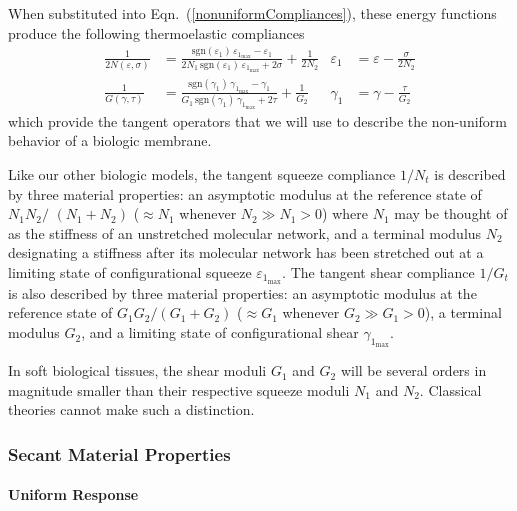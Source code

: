 When substituted into Eqn.~(\ref{nonuniformCompliances}), these energy functions produce the following thermo\-elastic compliances
\begin{subequations}
    \label{nonuniformComplianceFns}
    \begin{align}
    \frac{1}{2N(\varepsilon , \sigma)} & = \frac{ \mathrm{sgn} (\varepsilon_1) \, \varepsilon_{1_{\max}} - \varepsilon_1}{2N_1 \, \mathrm{sgn} (\varepsilon_1) \, \varepsilon_{1_{\max}} + 2\sigma} + \frac{1}{2N_2} &
    \varepsilon_1 & = \varepsilon - \frac{\sigma}{2N_2}
    \label{squeezeCompliance2D} \\
    \frac{1}{G(\gamma , \tau)} & = \frac{ \mathrm{sgn} (\gamma_1) \, \gamma_{1_{\max}} - \gamma_1}{G_1 \, \mathrm{sgn} (\gamma_1) \, \gamma_{1_{\max}} + 2 \tau} + \frac{1}{G_2} & 
    \gamma_1 & = \gamma - \frac{\tau}{G_2}
    \label{shearCompliance2D}
    \end{align}
\end{subequations}
which provide the tangent operators that we will use to describe the non-uniform behavior of a biologic membrane.

Like our other biologic models, the tangent squeeze compliance $1/N_t$ is described by three material properties: an asymptotic modulus at the reference state of $N_1 N_2 /$ $(N_1 + N_2)$ ($\approx N_1$ whenever $N_2 \gg N_1 > 0$) where $N_1$ may be thought of as the stiffness of an unstretched molecular network, and a terminal modulus $N_2$ designating a stiffness after its molecular network has been stretched out at a limiting state of configurational squeeze $\varepsilon_{1_{\max}}$.  The tangent shear compliance $1/G_t$ is also described by three material properties: an asymptotic modulus at the reference state of $G_1 G_2 / ( G_1 + G_2 )$ ($\approx G_1$ whenever $G_2 \gg G_1 > 0$), a terminal modulus $G_2$, and a limiting state of configurational shear $\gamma_{1_{\max}}$.  

In soft biological tissues, the shear moduli $G_1$ and $G_2$ will be several orders in magnitude smaller than their respective squeeze moduli $N_1$ and $N_2$.  Classical theories cannot make such a distinction.

\subsubsection{Secant Material Properties}

\paragraph{Uniform Response}


